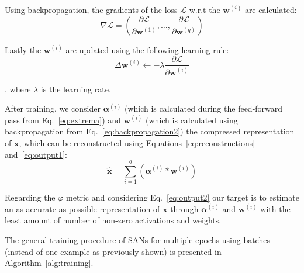 \documentclass[journal]{IEEEtran}
\begin{document}
Using backpropagation, the gradients of the loss $\mathcal{L}$ w.r.t the $\bm{w}^{(i)}$ are calculated:
\begin{equation}
	\label{eq:backpropagation1}
	\nabla\mathcal{L} = \left( \frac{\partial\mathcal{L}}{\partial\bm{w}^{(1)}},\ldots,\frac{\partial\mathcal{L}}{\partial\bm{w}^{(q)}}\right)
\end{equation}

Lastly the $\bm{w}^{(i)}$ are updated using the following learning rule:
\begin{equation}
	\label{eq:backpropagation2}
	\Delta\bm{w}^{(i)} \leftarrow -\lambda\frac{\partial\mathcal{L}}{\partial\bm{w}^{(i)}}
\end{equation}

\noindent
, where $\lambda$ is the learning rate.

After training, we consider $\bm{\alpha}^{(i)}$ (which is calculated during the feed-forward pass from Eq.~\ref{eq:extrema}) and $\bm{w}^{(i)}$ (which is calculated using backpropagation from Eq.~\ref{eq:backpropagation2}) the compressed representation of $\bm{x}$, which can be reconstructed using Equations~\ref{eq:reconstructions} and~\ref{eq:output1}:
\begin{equation}
	\label{eq:output2}
	\hat{\bm{x}} = \sum\limits_{i=1}^q \left(\bm{\alpha}^{(i)} * \bm{w}^{(i)}\right)
\end{equation}

Regarding the $\varphi$ metric and considering Eq.~\ref{eq:output2} our target is to estimate an as accurate as possible representation of $\bm{x}$ through $\bm{\alpha}^{(i)}$ and $\bm{w}^{(i)}$ with the least amount of number of non-zero activations and weights.

The general training procedure of SANs for multiple epochs using batches (instead of one example as previously shown) is presented in Algorithm~\ref{alg:training}.
\end{document}
